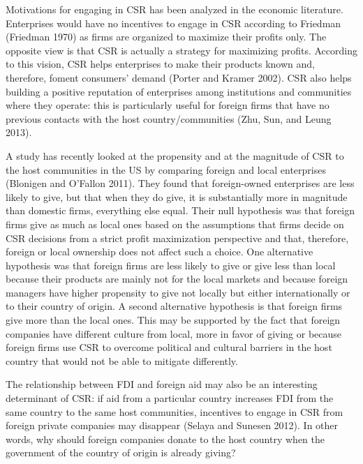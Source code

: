 \documentclass[]{article}
\begin{document}
Motivations for engaging in CSR has been analyzed in the economic
literature. Enterprises would have no incentives to engage in CSR
according to Friedman (Friedman 1970) as firms are organized to maximize
their profits only. The opposite view is that CSR is actually a strategy
for maximizing profits. According to this vision, CSR helps enterprises
to make their products known and, therefore, foment consumers' demand
(Porter and Kramer 2002). CSR also helps building a positive reputation
of enterprises among institutions and communities where they operate:
this is particularly useful for foreign firms that have no previous
contacts with the host country/communities (Zhu, Sun, and Leung 2013).

A study has recently looked at the propensity and at the magnitude of
CSR to the host communities in the US by comparing foreign and local
enterprises (Blonigen and O'Fallon 2011). They found that foreign-owned
enterprises are less likely to give, but that when they do give, it is
substantially more in magnitude than domestic firms, everything else
equal. Their null hypothesis was that foreign firms give as much as
local ones based on the assumptions that firms decide on CSR decisions
from a strict profit maximization perspective and that, therefore,
foreign or local ownership does not affect such a choice. One
alternative hypothesis was that foreign firms are less likely to give or
give less than local because their products are mainly not for the local
markets and because foreign managers have higher propensity to give not
locally but either internationally or to their country of origin. A
second alternative hypothesis is that foreign firms give more than the
local ones. This may be supported by the fact that foreign companies
have different culture from local, more in favor of giving or because
foreign firms use CSR to overcome political and cultural barriers in the
host country that would not be able to mitigate differently.

The relationship between FDI and foreign aid may also be an interesting
determinant of CSR: if aid from a particular country increases FDI from
the same country to the same host communities, incentives to engage in
CSR from foreign private companies may disappear (Selaya and Sunesen
2012). In other words, why should foreign companies donate to the host
country when the government of the country of origin is already giving?
\end{document}
